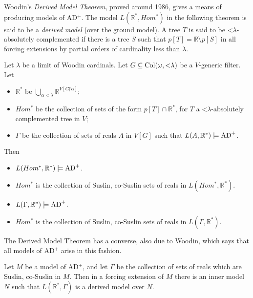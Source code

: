 \documentclass{book}%
\newcommand{\restrict}{\mathord{\upharpoonright}}
\newcommand{\less}{\mathord{<}}
\begin{document}
Woodin's \emph{Derived Model Theorem}, proved around 1986, gives
a means of producing models of AD${^+}$. The model $L(\mathbb{R}^{*}, Hom^{*})$ in the following
theorem is said to be a \emph{derived model} (over the ground model).
A tree $T$ is said to be $\less\lambda$-absolutely complemented if there is a tree $S$ such that
$p[T] = \mathbb{R} \setminus p[S]$ in all forcing extensions by partial orders of cardinality less
than $\lambda$.


\begin{theorem} Let $\lambda$ be a limit of Woodin cardinals. Let $G
\subseteq {\rm Col}(\omega, \less\lambda)$ be a $V$-generic filter. Let
\begin{itemize}
\item $\mathbb{R}^{*}$ be $\bigcup_{\alpha < \lambda}\mathbb{R}^{V[G
\restrict \alpha]}$;
\item $Hom^{*}$ be the collection of sets of
the form $p[T] \cap \mathbb{R}^{*}$, for $T$ a
$\less\lambda$-absolutely complemented tree in $V$;
\item $\Gamma$ be the collection of
sets of reals $A$ in $V[G]$ such that $L(A, \mathbb{R}^{*}) \models {\rm AD}^{+}$.
\end{itemize}
Then
\begin{itemize}
\item $L(Hom^{*}, \mathbb{R}^{*}) \models {\rm AD}^{+}$.
\item $Hom^{*}$ is the collection of Suslin, co-Suslin sets of reals
in $L(Hom^{*}, \mathbb{R}^{*})$.
\item $L(\Gamma, \mathbb{R}^{*}) \models {\rm AD}^{+}$.
\item $Hom^{*}$ is the collection of Suslin, co-Suslin sets of reals
in $L(\Gamma, \mathbb{R}^{*})$.
\end{itemize}
\end{theorem}

The Derived Model Theorem has a converse, also due to Woodin, which says that all models
of AD$^{+}$ arise in this fashion.

\begin{theorem} Let $M$ be a model of {\rm AD}$^{+}$, and let
$\Gamma$ be the collection of sets of reals which are Suslin,
co-Suslin in $M$. Then in a forcing extension of $M$ there is an
inner model $N$ such that $L(\mathbb{R}^{*}, \Gamma)$ is a derived
model over $N$.
\end{theorem}
\end{document}
